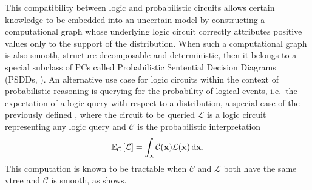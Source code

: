 This compatibility between logic and probabilistic circuits allows certain knowledge to be embedded
into an uncertain model by constructing a computational graph whose underlying logic circuit
correctly attributes positive values only to the support of the distribution. When such a
computational graph is also smooth, structure decomposable and deterministic, then it belongs to a
special subclass of PCs called Probabilistic Sentential Decision Diagrams (PSDDs, \cite{kisa14}).
An alternative use case for logic circuits within the context of probabilistic reasoning is
querying for the probability of logical events, i.e.\ the expectation of a logic query with respect
to a distribution, a special case of the previously defined , where the circuit to be
queried $\mathcal{L}$ is a logic circuit representing any logic query and $\mathcal{C}$ is the
probabilistic interpretation
\begin{equation*}
  \mathbb{E}_{\mathcal{C}}\left[\mathcal{L}\right]=\int_{\mathbf{x}}\mathcal{C}(\mathbf{x})\mathcal{L}(\mathbf{x})\mathop{}\!\mathrm{d}\mathbf{x}.
\end{equation*}
This computation is known to be tractable when $\mathcal{C}$ and $\mathcal{L}$ both have the same
vtree and $\mathcal{C}$ is smooth, as  shows.

